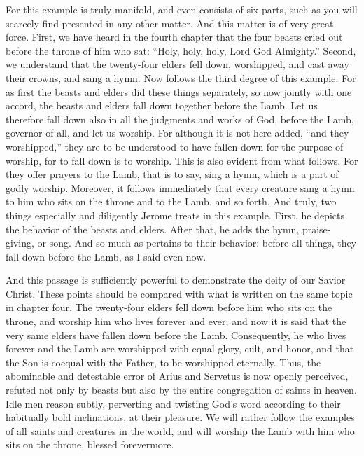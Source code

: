 For this example is truly manifold, and even consists of six parts, such as you will scarcely find presented in any other matter. And this matter is of very great force. First, we have heard in the fourth chapter that the four beasts cried out before the throne of him who sat: “Holy, holy, holy, Lord God Almighty.” Second, we understand that the twenty-four elders fell down, worshipped, and cast away their crowns, and sang a hymn. Now follows the third degree of this example. For as first the beasts and elders did these things separately, so now jointly with one accord, the beasts and elders fall down together before the Lamb. Let us therefore fall down also in all the judgments and works of God, before the Lamb, governor of all, and let us worship. For although it is not here added, “and they worshipped,” they are to be understood to have fallen down for the purpose of worship, for to fall down is to worship. This is also evident from what follows. For they offer prayers to the Lamb, that is to say, sing a hymn, which is a part of godly worship. Moreover, it follows immediately that every creature sang a hymn to him who sits on the throne and to the Lamb, and so forth. And truly, two things especially and diligently Jerome treats in this example. First, he depicts the behavior of the beasts and elders. After that, he adds the hymn, praise-giving, or song. And so much as pertains to their behavior: before all things, they fall down before the Lamb, as I said even now.

And this passage is sufficiently powerful to demonstrate the deity of our Savior Christ. These points should be compared with what is written on the same topic in chapter four. The twenty-four elders fell down before him who sits on the throne, and worship him who lives forever and ever; and now it is said that the very same elders have fallen down before the Lamb. Consequently, he who lives forever and the Lamb are worshipped with equal glory, cult, and honor, and that the Son is coequal with the Father, to be worshipped eternally. Thus, the abominable and detestable error of Arius and Servetus is now openly perceived, refuted not only by beasts but also by the entire congregation of saints in heaven. Idle men reason subtly, perverting and twisting God’s word according to their habitually bold inclinations, at their pleasure. We will rather follow the examples of all saints and creatures in the world, and will worship the Lamb with him who sits on the throne, blessed forevermore.

